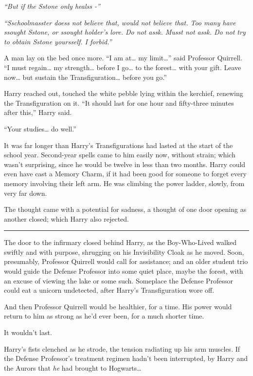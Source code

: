 \emph{``But if the Sstone only healss -''}

\emph{``Sschoolmasster doess not believe that, would not believe that.
Too many have ssought Sstone, or ssought holder's lore. Do not assk.
Musst not assk. Do not try to obtain Sstone yoursself. I forbid.''}

A man lay on the bed once more. ``I am at\ldots{} my limit\ldots{}''
said Professor Quirrell. ``I must regain\ldots{} my strength\ldots{}
before I go\ldots{} to the forest\ldots{} with your gift. Leave
now\ldots{} but sustain the Transfiguration\ldots{} before you go.''

Harry reached out, touched the white pebble lying within the kerchief,
renewing the Transfiguration on it. ``It should last for one hour and
fifty-three minutes after this,'' Harry said.

``Your studies\ldots{} do well.''

It was far longer than Harry's Transfigurations had lasted at the start
of the school year. Second-year spells came to him easily now, without
strain; which wasn't surprising, since he would be twelve in less than
two months. Harry could even have cast a Memory Charm, if it had been
good for someone to forget every memory involving their left arm. He was
climbing the power ladder, slowly, from very far down.

The thought came with a potential for sadness, a thought of one door
opening as another closed; which Harry also rejected.

\begin{center}\rule{3in}{0.4pt}\end{center}

The door to the infirmary closed behind Harry, as the Boy-Who-Lived
walked swiftly and with purpose, shrugging on his Invisibility Cloak as
he moved. Soon, presumably, Professor Quirrell would call for
assistance; and an older student trio would guide the Defense Professor
into some quiet place, maybe the forest, with an excuse of viewing the
lake or some such. Someplace the Defense Professor could eat a unicorn
undetected, after Harry's Transfiguration wore off.

And then Professor Quirrell would be healthier, for a time. His power
would return to him as strong as he'd ever been, for a much shorter
time.

It wouldn't last.

Harry's fists clenched as he strode, the tension radiating up his arm
muscles. If the Defense Professor's treatment regimen hadn't been
interrupted, by Harry and the Aurors that \emph{he} had brought to
Hogwarts\ldots{}

